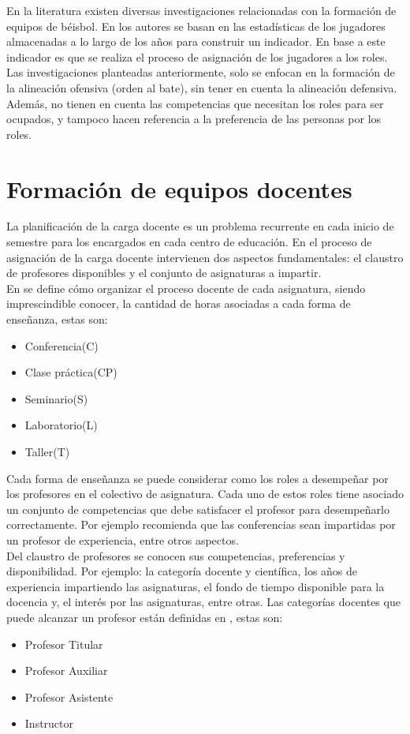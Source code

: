 En la literatura existen diversas investigaciones relacionadas con la formación de equipos de béisbol. En \cite{Polyashuk2015, Sugrue2007} los autores se basan en las estadísticas de los jugadores almacenadas a lo largo de los años para construir un indicador. En base a este indicador es que se realiza el proceso de asignación de los jugadores a los roles. Las investigaciones planteadas anteriormente, solo se enfocan en la formación de la alineación ofensiva (orden al bate), sin tener en cuenta la alineación defensiva. Además, no tienen en cuenta las competencias que necesitan los roles para ser ocupados, y tampoco hacen referencia a la preferencia de las personas por los roles.

\section{Formación de equipos docentes} \label{ej-carga}

La planificación de la carga docente es un problema recurrente en cada inicio de semestre para los encargados en cada centro de educación. En el proceso de asignación de la carga docente intervienen dos aspectos fundamentales: el claustro de profesores disponibles y el conjunto de asignaturas a impartir.\\

En \cite{res2018} se define cómo organizar el proceso docente de cada asignatura, siendo imprescindible conocer, la cantidad de horas asociadas a cada forma de enseñanza, estas son:
\begin{itemize}
	\item Conferencia(C)
	\item Clase práctica(CP)
	\item Seminario(S)
	\item Laboratorio(L)
	\item Taller(T)
\end{itemize}

Cada forma de enseñanza se puede considerar como los roles a desempeñar por los profesores en el colectivo de asignatura. Cada uno de estos roles tiene asociado un conjunto de competencias que debe satisfacer el profesor para desempeñarlo correctamente. Por ejemplo \cite{res2016} recomienda que las conferencias sean impartidas por un profesor de experiencia, entre otros aspectos.\\

Del claustro de profesores se conocen sus competencias, preferencias y disponibilidad. Por ejemplo: la categoría docente y científica, los años de experiencia impartiendo las asignaturas, el fondo de tiempo disponible para la docencia y, el interés por las asignaturas, entre otras. Las categorías docentes que puede alcanzar un profesor están definidas en \cite{res2016}, estas son:
\begin{itemize}
	\item Profesor Titular
	\item Profesor Auxiliar
	\item Profesor Asistente
	\item Instructor
\end{itemize} 

